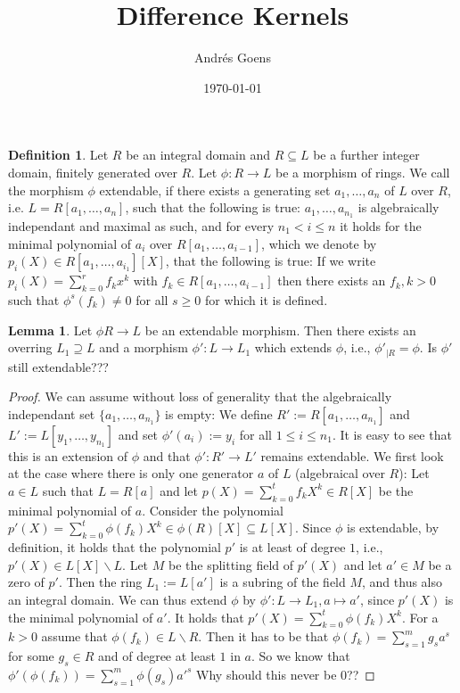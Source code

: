 \documentclass{article}
\title{Difference Kernels}
\author{Andr\'{e}s Goens}
\date{\today}
\theoremstyle{definition}
\newtheorem{defn}[Satz]{Definition}
\newtheorem{lem}[Satz]{Lemma}
\begin{document}
\begin{defn}
 Let $R$ be an integral domain and $R \subseteq L$ be a further integer domain, finitely generated over $R$.
Let $\phi : R \rightarrow L$ be a morphism of rings. We call the morphism $\phi$ extendable, if there exists a generating set ${a_1,\ldots,a_n}$ of $L$ over $R$, i.e. $L = R[a_1,\ldots,a_n]$,
such that the following is true: $a_1,\ldots,a_{n_1}$ is algebraically independant and maximal as such, and for every $n_1 < i \leq n$ it holds for the minimal polynomial of $a_i$ over $R[a_1,\ldots,a_{i-1}]$, which we denote by 
$p_i(X) \in R[a_1,\ldots,a_{i_1}][X]$, that the following is true: If we write $p_i(X) = \sum_{k=0}^r f_k x^k$ with $f_k \in R[a_1,\ldots,a_{i-1}]$ then there exists an $f_k, k > 0$ such that $\phi^s(f_k) \neq 0$ for all $s \geq 0$ for which it is defined.
\end{defn} %

\begin{lem} Let $\phi R \rightarrow L$ be an extendable morphism. Then there exists an overring $L_1 \supseteq L$ and a morphism $\phi': L \rightarrow L_1$ which extends $\phi$, i.e., $\phi'_{|R}=\phi$.
Is $\phi'$ still extendable???
\begin{proof}
We can assume without loss of generality that the algebraically independant set $\{a_1,\ldots,a_{n_1}\}$ is empty: 
We define $R':= R[a_1,\ldots,a_{n_1}]$ and $L':=L[y_1,\ldots,y_{n_1}]$ and set $\phi'(a_i) := y_i$ for all $1 \leq i \leq n_1$. 
It is easy to see that this is an extension of $\phi$ and that $\phi':R' \rightarrow L'$ remains extendable.
We first look at the case where there is only one generator $a$ of $L$ (algebraical over $R$):
Let $a \in L$ such that $L = R[a]$ and let $p(X)= \sum_{k=0}^t f_k X^k \in R[X]$ be the minimal polynomial of $a$. Consider the polynomial $p'(X) = \sum_{k=0}^t \phi(f_k) X^k \in \phi(R)[X] \subseteq L[X]$.
Since $\phi$ is extendable, by definition, it holds that the polynomial $p'$ is at least of degree $1$, i.e., $p'(X) \in L[X] \backslash L$. Let $M$ be the splitting field of $p'(X)$ and let $a' \in M$ be a zero of $p'$.
Then the ring $L_1:= L[a']$ is a subring of the field $M$, and thus also an integral domain. We can thus extend $\phi$ by $\phi': L \rightarrow L_1, a \mapsto a'$, since $p'(X)$ is the minimal polynomial of $a'$. 
It holds that $p'(X) = \sum_{k=0}^t \phi(f_k) X^k$. For a $k > 0$ assume that $\phi(f_k) \in L \backslash R$. Then it has to be that $\phi(f_k) = \sum_{s=1}^m g_s a^s$ for some $g_s \in R$ and of degree at least $1$ in $a$.
So we know that $\phi'(\phi(f_k)) = \sum_{s=1}^m \phi(g_s)a'^s$ Why should this never be $0$??

\end{proof}
\end{lem}
\end{document}
